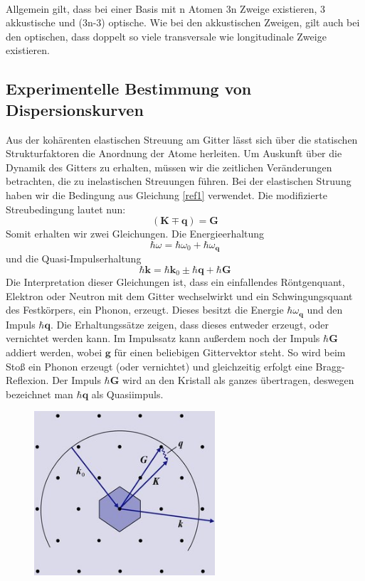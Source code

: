 \documentclass[11pt]{article}
\begin{document}
\paragraph{}Allgemein gilt, dass bei einer Basis mit n Atomen 3n Zweige
existieren, 3 akkustische und (3n-3) optische. Wie bei den akkustischen Zweigen,
gilt auch bei den optischen, dass doppelt so viele transversale wie
longitudinale Zweige existieren.
\subsection{Experimentelle Bestimmung von Dispersionskurven}
Aus der kohärenten elastischen Streuung am Gitter lässt sich über die statischen
Strukturfaktoren die Anordnung der Atome herleiten. Um Auskunft über die Dynamik
des Gitters zu erhalten, müssen wir die zeitlichen Veränderungen betrachten, die
zu inelastischen Streuungen führen. Bei der elastischen Struung haben wir die
Bedingung aus Gleichung \ref{ref1} verwendet. Die modifizierte Streubedingung
lautet nun:
\begin{equation}
  (\bm{K} \mp \bm{q}) = \bm{G}
\end{equation}
Somit erhalten wir zwei Gleichungen. Die Energieerhaltung
\begin{equation}
  \hbar\omega=\hbar\omega_0+\hbar\omega_{\bm{q}}
\end{equation}
und die Quasi-Impulserhaltung
\begin{equation}
  \hbar\bm{k}=\hbar\bm{k}_0\pm\hbar\bm{q}+\hbar\bm{G}
\end{equation}
Die Interpretation dieser Gleichungen ist, dass ein einfallendes Röntgenquant,
Elektron oder Neutron mit dem Gitter wechselwirkt und ein Schwingungsquant des
Festkörpers, ein Phonon, erzeugt. Dieses besitzt die Energie $\hbar\omega_{
\bm{q}}$ und den Impuls $\hbar\bm{q}$. Die Erhaltungssätze zeigen, dass dieses
entweder erzeugt, oder vernichtet werden kann. Im Impulssatz kann außerdem noch
der Impuls $\hbar\bm{G}$ addiert werden, wobei $\bm{g}$ für einen beliebigen
Gittervektor steht. So wird beim Stoß ein Phonon erzeugt (oder vernichtet) und
gleichzeitig erfolgt eine Bragg-Reflexion. Der Impuls $\hbar\bm{G}$ wird an den
Kristall als ganzes übertragen, deswegen bezeichnet man $\hbar\bm{q}$ als
Quasiimpuls.
\begin{figure}[h]
\includegraphics[width=0.6\textwidth]{ewald-kugel}
\centering
\label{fig:ewald-kugel}
\end{figure}
\end{document}
